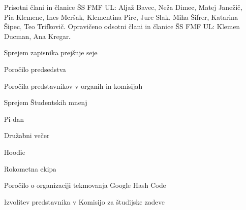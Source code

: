 \documentclass{seja}
\begin{document}
Prisotni člani in članice ŠS FMF UL:
Aljaž Bavec,
Neža Dimec,
Matej Janežič,
Pia Klemenc,
Ines Meršak,
Klementina Pirc,
Jure Slak,
Miha Šifrer,
Katarina Šipec,
Teo Trifkovič.
Opravičeno odsotni člani in članice ŠS FMF UL:
Klemen Ducman, Ana Kregar.



\begin{red*}
  \item Sprejem zapisnika prejšnje seje
  \item Poročilo predsedstva
  \item Poročila predstavnikov v organih in komisijah
  \item Sprejem Študentskih mnenj
  \item Pi-dan
  \item Družabni večer
  \item Hoodie
  \item Rokometna ekipa
  \item Poročilo o organizaciji tekmovanja Google Hash Code
  \item Izvolitev predstavnika v Komisijo za študijske zadeve
\end{red*}
\end{document}
